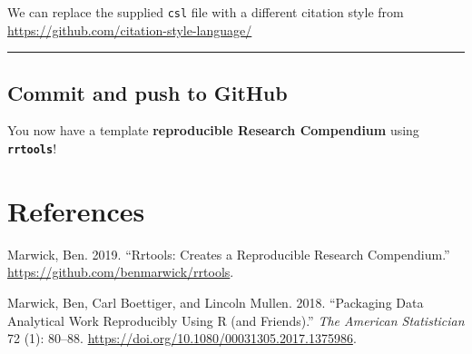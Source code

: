 \documentclass[
  letterpaper,
  DIV=11,
  numbers=noendperiod]{scrreprt}
\newlength{\cslhangindent}
\newlength{\cslentryspacingunit} %
\newenvironment{CSLReferences}[2] %
 {%
  \setlength{\parindent}{0pt}
  \ifodd #1
  \let\oldpar\par
  \def\par{\hangindent=\cslhangindent\oldpar}
  \fi
  \setlength{\parskip}{#2\cslentryspacingunit}
 }%
 {}
\begin{document}
We can replace the supplied \texttt{csl} file with a different citation
style from \url{https://github.com/citation-style-language/}

\begin{center}\rule{0.5\linewidth}{0.5pt}\end{center}

\hypertarget{commit-and-push-to-github}{%
\section{Commit and push to GitHub}\label{commit-and-push-to-github}}

You now have a template \textbf{reproducible Research Compendium} using
\textbf{\texttt{rrtools}}!🎉


\hypertarget{references}{%
\chapter*{References}\label{references}}

\hypertarget{refs}{}
\begin{CSLReferences}{1}{0}
\leavevmode{}%
Marwick, Ben. 2019. {``Rrtools: Creates a Reproducible Research
Compendium.''} \url{https://github.com/benmarwick/rrtools}.

\leavevmode{}%
Marwick, Ben, Carl Boettiger, and Lincoln Mullen. 2018. {``Packaging
Data Analytical Work Reproducibly Using R (and Friends).''} \emph{The
American Statistician} 72 (1): 80--88.
\url{https://doi.org/10.1080/00031305.2017.1375986}.

\end{CSLReferences}
\end{document}
